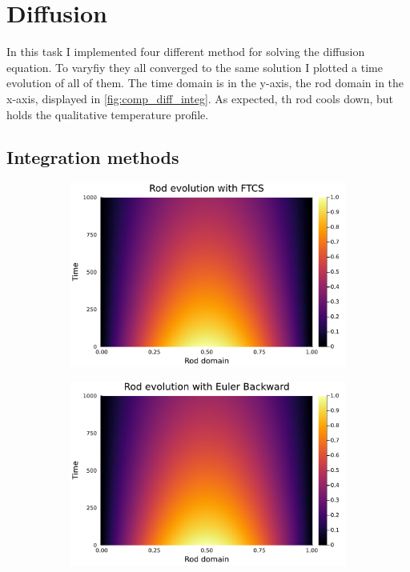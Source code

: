 \documentclass[
	a4paper, %
	10pt, %
]{CSUniSchoolLabReport}
\begin{document}
\section{Diffusion}

In this task I implemented four different method for solving the diffusion equation. To varyfiy they all converged to the same solution I plotted a time evolution of all of them. The time domain is in the y-axis, the rod domain in the x-axis, displayed in \autoref{fig:comp_diff_integ}. As expected, th rod cools down, but holds the qualitative temperature profile.

\subsection{Integration methods}

\begin{figure}[H]
	\centering
	\begin{subfigure}[b]{0.49\textwidth}
		\includegraphics[width=\textwidth]{../saves_t2/rod_FTCS.pdf}
	\end{subfigure}
	\hfill
	\begin{subfigure}[b]{0.49\textwidth}
		\includegraphics[width=\textwidth]{../saves_t2/rod_euler_back.pdf}

\end{subfigure}
\end{figure}
\end{document}
